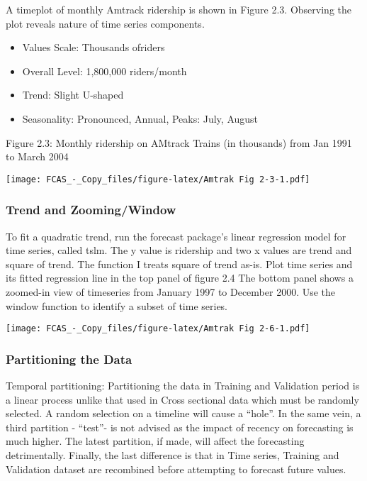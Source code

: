 \documentclass[]{article}
\begin{document}
A timeplot of monthly Amtrack ridership is shown in Figure 2.3.
Observing the plot reveals nature of time series components.

\begin{itemize}
\item
  Values Scale: Thousands ofriders
\item
  Overall Level: 1,800,000 riders/month
\item
  Trend: Slight U-shaped
\item
  Seasonality: Pronounced, Annual, Peaks: July, August
\end{itemize}

Figure 2.3: Monthly ridership on AMtrack Trains (in thousands) from Jan
1991 to March 2004

\texttt{[image: FCAS\_-\_Copy\_files/figure-latex/Amtrak Fig 2-3-1.pdf]}

\subsubsection{Trend and Zooming/Window}\label{trend-and-zoomingwindow}

To fit a quadratic trend, run the forecast package's linear regression
model for time series, called tslm. The y value is ridership and two x
values are trend and square of trend. The function I treats square of
trend as-is. Plot time series and its fitted regression line in the top
panel of figure 2.4 The bottom panel shows a zoomed-in view of
timeseries from January 1997 to December 2000. Use the window function
to identify a subset of time series.

\texttt{[image: FCAS\_-\_Copy\_files/figure-latex/Amtrak Fig 2-6-1.pdf]}

\subsubsection{Partitioning the Data}\label{partitioning-the-data}

Temporal partitioning: Partitioning the data in Training and Validation
period is a linear process unlike that used in Cross sectional data
which must be randomly selected. A random selection on a timeline will
cause a ``hole''. In the same vein, a third partition - ``test''- is not
advised as the impact of recency on forecasting is much higher. The
latest partition, if made, will affect the forecasting detrimentally.
Finally, the last difference is that in Time series, Training and
Validation dataset are recombined before attempting to forecast future
values.
\end{document}
